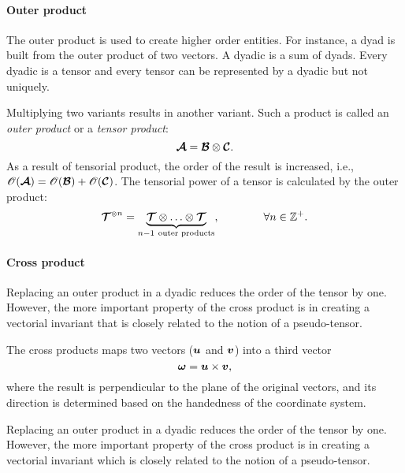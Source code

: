 \paragraph{Outer product} The outer product is used to create higher order entities. For instance, a dyad is built from the outer product of two vectors. A dyadic is a sum of dyads. Every dyadic is a tensor and every tensor can be represented by a dyadic but not uniquely. 

\begin{definition}
    Multiplying two variants results in another variant. Such a product is called an \textit{outer product} or a \textit{tensor product}:
    \begin{equation}
    \ten{A}=\ten{B}\dyad\ten{C}.
    \end{equation}
    As a result of tensorial product, the order of the result is increased, i.e., $\mathscr{O}(\mathord{\mbox{\boldmath$\mathcal{A}$}})
    =\mathscr{O}(\mathord{\mbox{\boldmath$\mathcal{B}$}})+\mathscr{O}(\mathord{\mbox{\boldmath$\mathcal{C}$}})$.
        The tensorial power of a tensor is calculated by the outer product:
        \begin{equation}
        \ten{T}^\tenpow{n}=\underbrace{\ten{T}\dyad\ldots\dyad\ten{T}}_{n-1\ \text{outer products}},\qquad\qquad\forall n\in\Integer^+.
        \end{equation}    
\end{definition}


\paragraph{Cross product} Replacing an outer product in a dyadic reduces the order of the tensor by one. However, the more important property of the cross product is in creating a vectorial invariant that is closely related to the notion of a pseudo-tensor.
\begin{definition}
The cross products maps two vectors ($\tena{u}$ and $\tena{v}$) into a third vector 
\begin{equation}
\tena{\omega}=\tena{u}\times\tena{v},
\end{equation}
where the result is perpendicular to the plane of the original vectors, and its direction is determined based on the handedness of the coordinate system. 
\end{definition}
\red
Replacing an outer product in a dyadic reduces the order of the tensor by one. However, the more important property of the cross product is in creating a vectorial invariant which is closely related to the notion of a pseudo-tensor.

